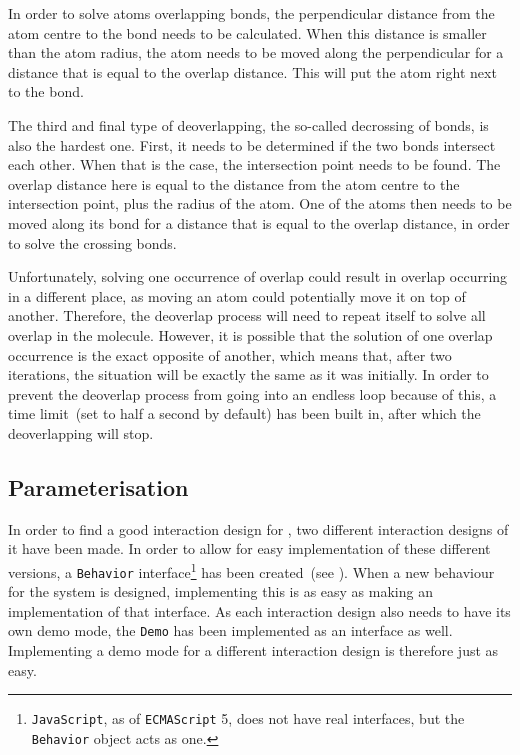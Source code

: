 In order to solve atoms overlapping bonds, the perpendicular distance from the atom centre to the bond needs to be calculated. When this distance is smaller than the atom radius, the atom needs to be moved along the perpendicular for a distance that is equal to the overlap distance. This will put the atom right next to the bond.

The third and final type of deoverlapping, the so-called decrossing of bonds, is also the hardest one. First, it needs to be determined if the two bonds intersect each other. When that is the case, the intersection point needs to be found. The overlap distance here is equal to the distance from the atom centre to the intersection point, plus the radius of the atom. One of the atoms then needs to be moved along its bond for a distance that is equal to the overlap distance, in order to solve the crossing bonds.

Unfortunately, solving one occurrence of overlap could result in overlap occurring in a different place, as moving an atom could potentially move it on top of another. Therefore, the deoverlap process will need to repeat itself to solve all overlap in the molecule. However, it is possible that the solution of one overlap occurrence is the exact opposite of another, which means that, after two iterations, the situation will be exactly the same as it was initially. In order to prevent the deoverlap process from going into an endless loop because of this, a time limit~(set to half a second by default) has been built in, after which the deoverlapping will stop.


\subsection{Parameterisation}
In order to find a good interaction design for \oframp, two different interaction designs of it have been made. In order to allow for easy implementation of these different versions, a \verb|Behavior| interface\footnote{\texttt{JavaScript}, as of \texttt{ECMAScript} 5, does not have real interfaces, but the \texttt{Behavior} object acts as one.} has been created~(see ). When a new behaviour for the system is designed, implementing this is as easy as making an implementation of that interface. As each interaction design also needs to have its own demo mode, the \verb|Demo| has been implemented as an interface as well. Implementing a demo mode for a different interaction design is therefore just as easy.



